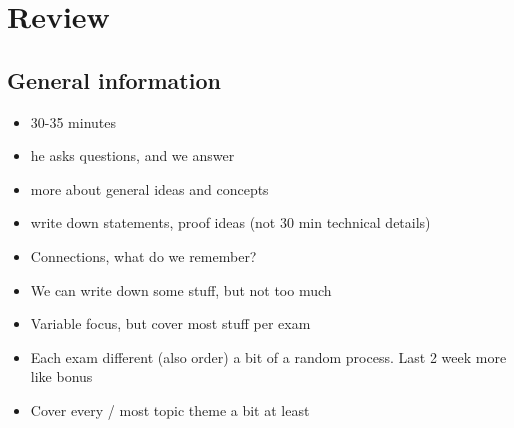 
\chapter{Review}

\section{General information}

\begin{itemize}
    \item 30-35 minutes
    \item he asks questions, and we answer
    \item more about general ideas and concepts
    \item write down statements, proof ideas (not 30 min technical details)
    \item Connections, what do we remember?
    \item We can write down some stuff, but not too much 
    \item Variable focus, but cover most stuff per exam
    \item Each exam different (also order) a bit of a random process. Last 2 week more like bonus 
    \item Cover every / most topic theme a bit at least
\end{itemize}

